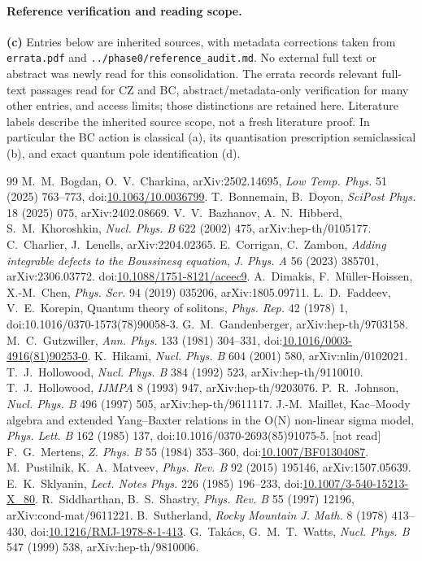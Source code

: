 \documentclass[11pt,a4paper]{article}
\newcommand{\Lc}{\textsf{\textbf{(c)}}\xspace}
\newcommand{\file}[1]{\nolinkurl{#1}}
\theoremstyle{remark}\newtheorem{remark}[proposition]{Remark}
\begin{document}
\paragraph{Reference verification and reading scope.}
\Lc Entries below are inherited sources, with metadata corrections taken from
\file{errata.pdf} and \file{../phase0/reference_audit.md}. No external full text
or abstract was newly read for this consolidation. The errata records relevant
full-text passages read for CZ and BC, abstract/metadata-only verification for
many other entries, and access limits; those distinctions are retained here.
Literature labels describe the inherited source scope, not a fresh literature
proof. In particular the BC action is classical (a), its quantisation
prescription semiclassical (b), and exact quantum pole identification (d).

\begin{thebibliography}{99}\footnotesize\setlength{\itemsep}{1pt}
 M.~M.~Bogdan, O.~V.~Charkina, arXiv:2502.14695, \emph{Low Temp. Phys.} 51 (2025) 763--773, doi:\url{10.1063/10.0036799}.
 T.~Bonnemain, B.~Doyon, \emph{SciPost Phys.} 18 (2025) 075, arXiv:2402.08669.
 V.~V.~Bazhanov, A.~N.~Hibberd, S.~M.~Khoroshkin, \emph{Nucl. Phys. B} 622 (2002) 475, arXiv:hep-th/0105177.
 C.~Charlier, J.~Lenells, arXiv:2204.02365.
 E.~Corrigan, C.~Zambon, \emph{Adding integrable defects to the Boussinesq equation}, \emph{J. Phys. A} 56 (2023) 385701, arXiv:2306.03772. doi:\url{10.1088/1751-8121/aceec9}.
 A.~Dimakis, F.~Müller-Hoissen, X.-M.~Chen, \emph{Phys. Scr.} 94 (2019) 035206, arXiv:1805.09711.
 L.~D.~Faddeev, V.~E.~Korepin, Quantum theory of solitons, \emph{Phys. Rep.} 42 (1978) 1, doi:10.1016/0370-1573(78)90058-3.
 G.~M.~Gandenberger, arXiv:hep-th/9703158.
 M.~C.~Gutzwiller, \emph{Ann. Phys.} 133 (1981) 304--331, doi:\url{10.1016/0003-4916(81)90253-0}.
 K.~Hikami, \emph{Nucl. Phys. B} 604 (2001) 580, arXiv:nlin/0102021.
 T.~J.~Hollowood, \emph{Nucl. Phys. B} 384 (1992) 523, arXiv:hep-th/9110010.
 T.~J.~Hollowood, \emph{IJMPA} 8 (1993) 947, arXiv:hep-th/9203076.
 P.~R.~Johnson, \emph{Nucl. Phys. B} 496 (1997) 505, arXiv:hep-th/9611117.
 J.-M.~Maillet, Kac--Moody algebra and extended Yang--Baxter relations in the O(N) non-linear sigma model, \emph{Phys. Lett. B} 162 (1985) 137, doi:10.1016/0370-2693(85)91075-5. [not read]
 F.~G.~Mertens, \emph{Z. Phys. B} 55 (1984) 353--360, doi:\url{10.1007/BF01304087}.
 M.~Pustilnik, K.~A.~Matveev, \emph{Phys. Rev. B} 92 (2015) 195146, arXiv:1507.05639.
 E.~K.~Sklyanin, \emph{Lect. Notes Phys.} 226 (1985) 196--233, doi:\url{10.1007/3-540-15213-X_80}.
 R.~Siddharthan, B.~S.~Shastry, \emph{Phys. Rev. B} 55 (1997) 12196, arXiv:cond-mat/9611221.
 B.~Sutherland, \emph{Rocky Mountain J. Math.} 8 (1978) 413--430, doi:\url{10.1216/RMJ-1978-8-1-413}.
 G.~Takács, G.~M.~T.~Watts, \emph{Nucl. Phys. B} 547 (1999) 538, arXiv:hep-th/9810006.
\end{thebibliography}
\end{document}

